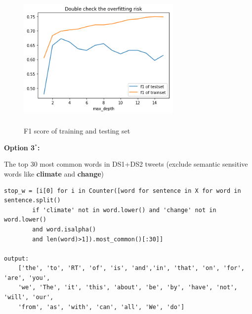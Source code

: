\documentclass{article} %
\begin{document}
\begin{figure}[H]
	\centering
	\includegraphics[height=7cm, width=8cm]{3.png}
	\caption{F1 score of training and testing set}
\end{figure}


\textbf{Option 3$^*$:}

The top 30 most common words in DS1+DS2 tweets (exclude semantic sensitive words like \textbf{climate} and \textbf{change})

\lstset{language=Python}
\lstset{frame=lines}
\lstset{basicstyle=\footnotesize}
\begin{lstlisting}
stop_w = [i[0] for i in Counter([word for sentence in X for word in sentence.split() 
		if 'climate' not in word.lower() and 'change' not in word.lower()
		and word.isalpha() 
		and len(word)>1]).most_common()[:30]]

output: 
	['the', 'to', 'RT', 'of', 'is',	'and','in', 'that', 'on', 'for', 'are',	'you', 
	'we', 'The', 'it', 'this', 'about', 'be', 'by', 'have', 'not', 'will', 'our', 
	'from', 'as', 'with', 'can', 'all', 'We', 'do']
\end{lstlisting}
\end{document}
